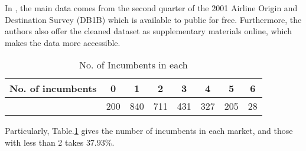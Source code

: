 \documentclass[a4paper]{article}
\begin{document}
In \cite{ciliberto2009market}, the main data comes from the second quarter of the 2001 Airline Origin and Destination Survey (DB1B) which is available to public for free. Furthermore, the authors also offer the cleaned dataset as supplementary materials online, which makes the data more accessible. 

\begin{table}[h!]
\centering
\caption{No. of Incumbents in each }
\begin{tabular}{cccccccc} 
 \hline
 No. of incumbents & 0 & 1 & 2 & 3 & 4 & 5 & 6 \\ 
 \hline
 & 200 & 840 & 711 & 431 & 327 & 205 & 28 \\ 
 \hline
\end{tabular}
\label{no.of.icb}

\end{table}

Particularly, Table.\ref{no.of.icb} gives the number of incumbents in each market, and those with less than 2 takes $37.93\%$.




\end{document}
